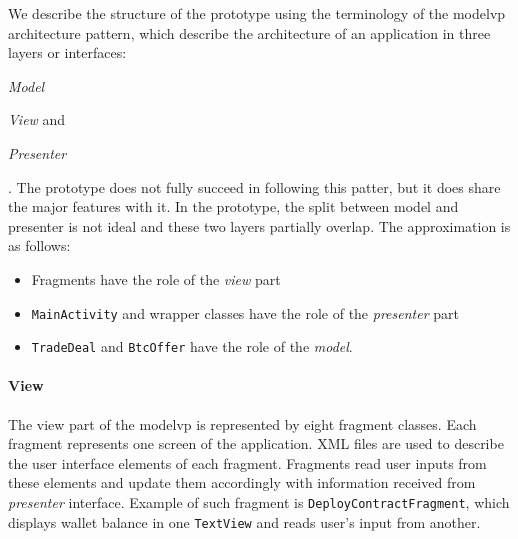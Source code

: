 We describe the structure of the prototype using the terminology of the \acrfull{modelvp} architecture pattern, which describe the architecture of an application in three layers or interfaces:
\begin{enumerate*}[label=(\roman*)]
    \item \textit{Model}
    \item \textit{View} and
    \item \textit{Presenter}
\end{enumerate*}.
The prototype does not fully succeed in following this patter, but it does share the major features with it. In the prototype, the split between model and presenter is not ideal and these two layers partially overlap. The approximation is as follows:
\begin{itemize}[noitemsep]
    \item Fragments have the role of the \textit{view} part
    \item \texttt{MainActivity} and wrapper classes have the role of the \textit{presenter} part
    \item \texttt{TradeDeal} and \texttt{BtcOffer} have the role of the \textit{model}.
\end{itemize}

\paragraph{View} The view part of the \acrshort{modelvp} is represented by eight fragment classes. Each fragment represents one screen of the application. XML files are used to describe the user interface elements of each fragment. Fragments read user inputs from these elements and update them accordingly with information received from \textit{presenter} interface. Example of such fragment is \texttt{DeployContractFragment}, which displays wallet balance in one \texttt{TextView} and reads user's input from another.

